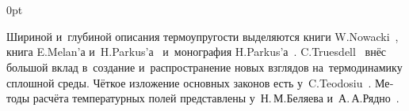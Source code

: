 \section*{\small \wordforbibliography}

\begin{changemargin}{\parindent}{0pt}
\fontsize{10}{12}\selectfont

\begin{otherlanguage}{russian}

Шириной и~глубиной описания термоупругости выделяются книги \hbox{W\hspace{-0.2ex}.\:Nowacki}~\cite{nowacki-problemsofthermoelasticity, nowacki-elasticity}, книга E.\:Melan’а и~H.\:Parkus’а~\cite{parkus.melan-waermespannungen} и~моно\-графия H.\:Parkus’а~\cite{parkus-waermespannungen}.
C.\:Truesdell~\cite{truesdell-firstcourse} внёс большой вклад в~создание и~распространение новых взглядов на~термодинамику сплошной среды.
Чёткое изложение основных законов есть у~C.\:Teodosiu~\cite{teodosiu-crystaldefects}.
Методы расчёта температурных полей представлены у~Н.\,М.\;Беляева и~А.\,А.\;Рядно~\cite{belyaev.ryadno}.

\end{otherlanguage}

\end{changemargin}

